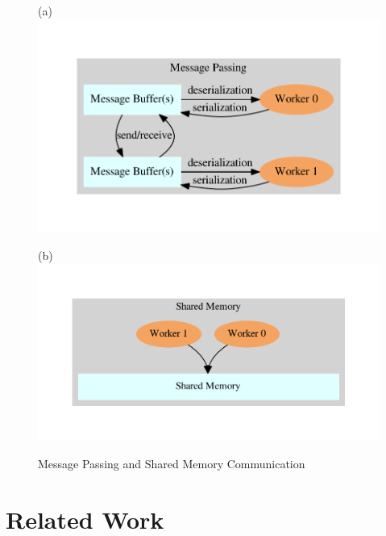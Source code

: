 \documentclass[11pt]{book}
\begin{document}
\begin{figure}[H]
  \begin{minipage}{.5\textwidth}
    \begin{center}
      (a)
      \includegraphics[width=\textwidth,keepaspectratio,quiet]{figs/graphviz/message_passing.pdf}
    \end{center}  
  \end{minipage}%
  \hfill
  \begin{minipage}{.5\textwidth}
    \begin{center}
      (b) 
      \includegraphics[width=\textwidth,keepaspectratio,quiet]{figs/graphviz/shared_memory.pdf}
    \end{center}  
  \end{minipage}
  \caption{Message Passing and Shared Memory Communication}\label{communication}
\end{figure}



\chapter{Related Work}\label{related_work}
\end{document}
